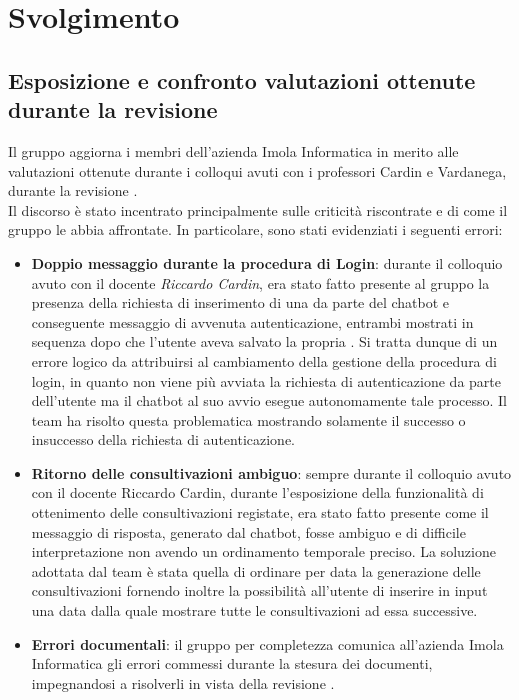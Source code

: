 \section{Svolgimento}
\subsection{Esposizione e confronto valutazioni ottenute durante la revisione }
Il gruppo aggiorna i membri dell'azienda Imola Informatica in merito alle valutazioni ottenute durante i colloqui avuti con i professori Cardin e Vardanega, durante la revisione . \\
Il discorso è stato incentrato principalmente sulle criticità riscontrate e di come il gruppo le abbia affrontate. In particolare, sono stati evidenziati i seguenti errori: 
\begin{itemize}
    \item \textbf{Doppio messaggio durante la procedura di Login}: durante il colloquio avuto con il docente \textit{Riccardo Cardin}, era stato fatto presente al gruppo la presenza della richiesta di inserimento di una  da parte del chatbot e conseguente messaggio di avvenuta autenticazione, entrambi mostrati in sequenza dopo che l'utente aveva salvato la propria . Si tratta dunque di un errore logico da attribuirsi al cambiamento della gestione della procedura di login, in quanto non viene più avviata la richiesta di autenticazione da parte dell'utente ma il chatbot al suo avvio esegue autonomamente tale processo. Il team ha risolto questa problematica mostrando solamente il successo o insuccesso della richiesta di autenticazione.
    \item \textbf{Ritorno delle consultivazioni ambiguo}: sempre durante il colloquio avuto con il docente Riccardo Cardin, durante l'esposizione della funzionalità di ottenimento delle consultivazioni registate, era stato fatto presente come il messaggio di risposta, generato dal chatbot, fosse ambiguo e di difficile interpretazione non avendo un ordinamento temporale preciso. La soluzione adottata dal team è stata quella di ordinare per data la generazione delle consultivazioni fornendo inoltre la possibilità all'utente di inserire in input una data dalla quale mostrare tutte le consultivazioni ad essa successive. 
    \item \textbf{Errori documentali}: il gruppo per completezza comunica all'azienda Imola Informatica gli errori commessi durante la stesura dei documenti, impegnandosi a risolverli in vista della revisione .
\end{itemize}

